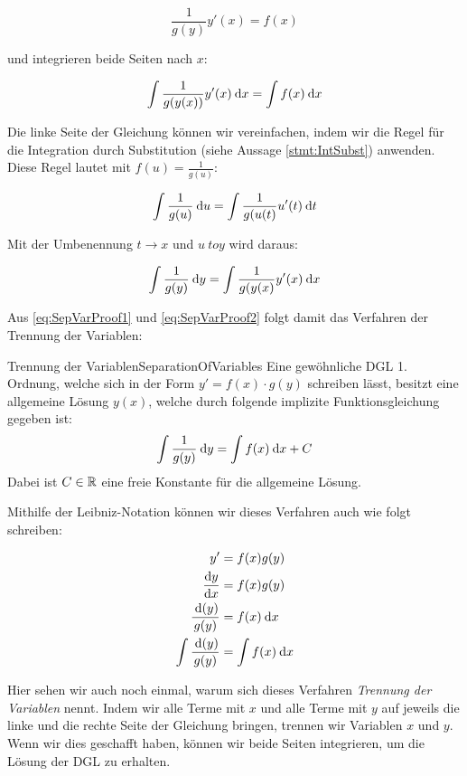 $$
    \frac{1}{g(y)} y'(x) =  f(x)
$$

und integrieren beide Seiten nach $x$:

\begin{equation}
    \int \frac{1}{g(y(x))} y'(x) \:\mathrm{d}{x} =  \int f(x) \:\mathrm{d}{x} \label{eq:SepVarProof1}
\end{equation}

Die linke Seite der Gleichung können wir vereinfachen, indem wir die Regel für die Integration durch Substitution (siehe Aussage \ref{stmt:IntSubst}) anwenden. Diese Regel lautet mit $f(u) = \frac{1}{g(u)}$:

$$
    \int \frac{1}{g(u)} \:\mathrm{d}{u} = \int \frac{1}{g(u(t)} u'(t) \:\mathrm{d}{t}
$$

Mit der Umbenennung $t \to x$ und $u \ to y$ wird daraus:

\begin{equation}
    \int \frac{1}{g(y)} \:\mathrm{d}{y} = \int \frac{1}{g(y(x)} y'(x) \:\mathrm{d}{x} \label{eq:SepVarProof2}
\end{equation}

Aus \ref{eq:SepVarProof1} und \ref{eq:SepVarProof2} folgt damit das Verfahren der Trennung der Variablen:

\begin{statement}{Trennung der Variablen}{SeparationOfVariables}
    Eine gewöhnliche DGL 1. Ordnung, welche sich in der Form $y' = f(x) \cdot g(y)$ schreiben lässt, besitzt eine allgemeine Lösung $y(x)$, welche durch folgende implizite Funktionsgleichung gegeben ist:
    $$
        \int \frac{1}{g(y)} \:\mathrm{d}{y} = \int f(x) \:\mathrm{d}{x} + C
    $$
    Dabei ist $C \in \mathbb{R}$ eine freie Konstante für die allgemeine Lösung.
\end{statement}

Mithilfe der Leibniz-Notation können wir dieses Verfahren auch wie folgt schreiben:

\begin{alignat*}{1}
    y'        &= f(x) g(y) \\
    \frac{\mathrm{d}{y}}{\mathrm{d}{x}} &= f(x) g(y) \\
    \frac{\:\mathrm{d}{(}y)}{g(y)}      &= f(x) \:\mathrm{d}{x} \\
    \int \frac{\:\mathrm{d}{(}y)}{g(y)} &= \int f(x) \:\mathrm{d}{x}
\end{alignat*}

Hier sehen wir auch noch einmal, warum sich dieses Verfahren \emph{Trennung der Variablen} nennt. Indem wir alle Terme mit $x$ und alle Terme mit $y$ auf jeweils die linke und die rechte Seite der Gleichung bringen, trennen wir Variablen $x$ und $y$. Wenn wir dies geschafft haben, können wir beide Seiten integrieren, um die Lösung der DGL zu erhalten.

